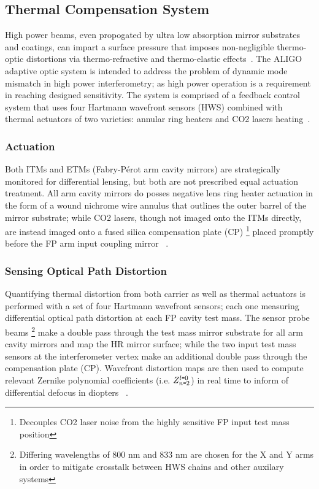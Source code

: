 \subsection{Thermal Compensation System}
High power beams, even propogated by ultra low absorption mirror substrates and coatings, can impart a surface pressure that imposes non-negligible thermo-optic distortions via thermo-refractive and thermo-elastic effects~\cite{hellovinet:1990}. The ALIGO adaptive optic system is intended to address the problem of dynamic mode mismatch in high power interferometry; as high power operation is a requirement in reaching designed sensitivity. The system is comprised of a feedback control system that uses four Hartmann wavefront sensors (HWS) combined with thermal actuators of two varieties: annular ring heaters and CO2 lasers heating~\cite{diss:brooks}.  

\subsubsection{Actuation}
Both ITMs and ETMs (Fabry-P\'{e}rot arm cavity mirrors) are strategically monitored for differential lensing, but both are not prescribed equal actuation treatment. All arm cavity mirrors do posses negative lens ring heater actuation in the form of a wound nichrome wire annulus that outlines the outer barrel of the mirror substrate; while CO2 lasers, though not imaged onto the ITMs directly, are instead imaged onto a fused silica compensation plate (CP) \footnote{Decouples CO2 laser noise from the highly sensitive FP input test mass position} placed promptly before the FP arm input coupling mirror ~\cite{brooks:aigwd2019}.

\subsubsection{Sensing Optical Path Distortion}
Quantifying thermal distortion from both carrier as well as thermal actuators is performed with a set of four Hartmann wavefront sensors; each one measuring differential optical path distortion at each FP cavity test mass. The sensor probe beams \footnote{Differing wavelengths of 800 nm and 833 nm are chosen for the X and Y arms in order to mitigate crosstalk between HWS chains and other auxilary systems} make a double pass through the test mass mirror substrate for all arm cavity mirrors and map the HR mirror surface; while the two input test mass sensors at the interferometer vertex make an additional double pass through the compensation plate (CP). Wavefront distortion maps are then used to compute relevant Zernike polynomial coefficients (i.e. $Z^{l \texttt{=} 0}_{n \texttt{=} 2}$) in real time to inform of differential defocus in diopters ~\cite{aasi:2015}.



